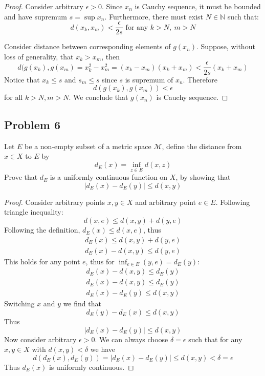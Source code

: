 \documentclass{article}
\newcommand{\N}{\mathbb{N}}
\begin{document}
\begin{proof}

Consider arbitrary $\epsilon > 0$. Since $x_n$ is Cauchy sequence, it must be bounded and have supremum $s = \sup x_n$.
Furthermore, there must exist $N \in \N$ such that:
\[ d(x_k, x_m) < \frac{\epsilon}{2s} \text{ for any } k > N, \> m > N \]

Consider distance between corresponding elements of $g(x_n)$.
Suppose, without loss of generality, that $x_k > x_m$, then
\[ d (g(x_k), g(x_m) = x_k^2 - x_m^2 = (x_k - x_m) (x_k + x_m) <  \frac{\epsilon}{2s} (x_k+x_m) \]
Notice that $x_k \leq s$ and $s_m \leq s$ since $s$ is supremum of $x_n$. Therefore
\[ d (g(x_k), g(x_m)) < \epsilon \]
for all $k > N, m > N$.
We conclude that $g(x_n)$ is Cauchy sequence.

\end{proof}


\subsection*{Problem 6}

\begin{tcolorbox}
Let $E$ be a non-empty subset of a metric space $\mathcal{M}$, define the distance from $x \in X$ to $E$ by
\[ d_E(x) = \inf_{z \in E} d(x,z) \]
Prove that $d_E$ is a uniformly continuous function on $X$, by showing that
\[ | d_E(x) - d_E(y) | \leq d(x,y) \]
\end{tcolorbox}

\begin{proof}

Consider arbitrary points $x,y \in X$ and arbitrary point $e \in E$. Following triangle inequality:
\[ d(x,e) \leq d(x,y) + d(y,e) \]
Following the definition, $d_E(x) \leq d(x,e)$, thus 
\begin{gather*}
    d_E(x) \leq d(x,y) + d(y,e) \\
    d_E(x) - d(x,y) \leq d(y,e)    
\end{gather*}
This holds for any point $e$, thus for $\inf_{e \in E}(y,e) = d_E(y)$:
\begin{gather*}
    d_E(x) - d(x,y) \leq d_E(y) \\
    d_E(x) - d(x,y) \leq d_E(y) \\
    d_E(x) - d_E(y) \leq d(x,y)    
\end{gather*}
Switching $x$ and $y$ we find that
\[ d_E(y) - d_E(x) \leq d(x,y) \]
Thus
\[ | d_E(x) - d_E(y) | \leq d(x,y) \]
Now consider arbitrary $\epsilon > 0$.
We can always choose $\delta = \epsilon$ such that for any $x,y \in X$ with $d(x,y)<\delta$ we have
\[ d(d_E(x), d_E(y)) = |d_E(x)-d_E(y)| \leq d(x,y) < \delta = \epsilon \]
Thus $d_E(x)$ is uniformly continuous.

\end{proof}
\end{document}

